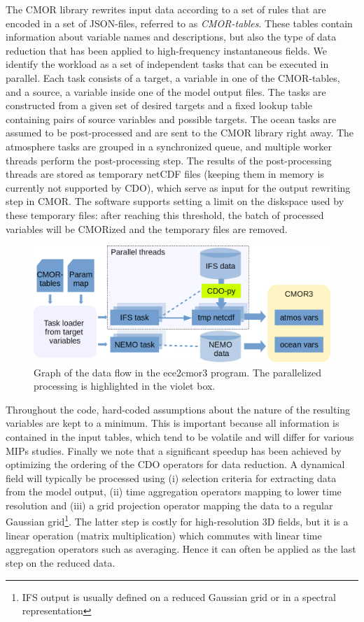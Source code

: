 \documentclass[procedia]{easychair}
\begin{document}
The CMOR library rewrites input data according to a set of rules that are 
encoded in a set of JSON-files, referred to as \emph{CMOR-tables}. These tables 
contain information about variable names and descriptions, but also the type of 
data reduction that has been applied to high-frequency instantaneous fields. We 
identify the workload as a set of independent tasks that can be executed in 
parallel. Each task consists of a target, a variable in one of the CMOR-tables, 
and a source, a variable inside one of the model output files. The tasks are 
constructed from a given set of desired targets and a fixed lookup table 
containing pairs of source variables and possible targets. The ocean tasks 
are assumed to be post-processed and are sent to the CMOR library right away. 
The atmosphere tasks are grouped in a synchronized queue, and multiple worker 
threads perform the post-processing step. The results of the post-processing 
threads are stored as temporary netCDF files (keeping them in memory is 
currently not supported by CDO), which serve as input for the output rewriting 
step in CMOR. The software supports setting a limit on the diskspace used by 
these temporary files: after reaching this threshold, the batch of processed 
variables will be CMORized and the temporary files are removed.

\begin{figure}[ht]
 \centering
 \includegraphics[width=\textwidth,clip]{ece2cmor3flowv3.png}
 \caption{Graph of the data flow in the ece2cmor3 program. The parallelized 
processing is highlighted in the violet box.}
\label{fig:design}
\end{figure}

Throughout the code, hard-coded assumptions about the nature of the resulting 
variables are kept to a minimum. This is important because all information is 
contained in the input tables, which tend to be volatile and will differ for 
various MIPs studies. Finally we note that a significant speedup has 
been achieved by optimizing the ordering of the CDO operators for data 
reduction. A dynamical field will typically be processed using (i) selection 
criteria for extracting data from the model output, (ii) time aggregation 
operators mapping to lower time resolution and (iii) a grid projection operator 
mapping the data to a regular Gaussian grid\footnote{IFS output is usually 
defined on a reduced Gaussian grid or in a spectral representation}. The latter 
step is costly for high-resolution 3D fields, but it is a linear operation 
(matrix multiplication) which commutes with linear time aggregation operators 
such as averaging. Hence it can often be applied as the last step on the 
reduced data.
\end{document}
